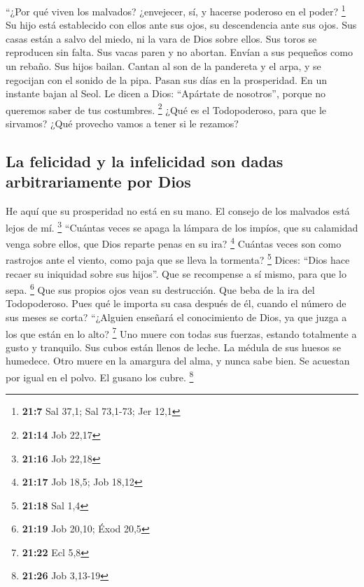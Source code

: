  ``¿Por qué viven los malvados? ¿envejecer, sí, y hacerse
poderoso en el poder? \footnote{\textbf{21:7} Sal 37,1; Sal 73,1-73; Jer
  12,1}  Su hijo está establecido con ellos ante sus ojos,
su descendencia ante sus ojos.  Sus casas están a salvo
del miedo, ni la vara de Dios sobre ellos.  Sus toros se
reproducen sin falta. Sus vacas paren y no abortan. 
Envían a sus pequeños como un rebaño. Sus hijos bailan. 
Cantan al son de la pandereta y el arpa, y se regocijan con el sonido de
la pipa.  Pasan sus días en la prosperidad. En un
instante bajan al Seol.  Le dicen a Dios: ``Apártate de
nosotros'', porque no queremos saber de tus costumbres. \footnote{\textbf{21:14}
  Job 22,17}  ¿Qué es el Todopoderoso, para que le
sirvamos? ¿Qué provecho vamos a tener si le rezamos?

\hypertarget{la-felicidad-y-la-infelicidad-son-dadas-arbitrariamente-por-dios}{%
\subsection{La felicidad y la infelicidad son dadas arbitrariamente por
Dios}\label{la-felicidad-y-la-infelicidad-son-dadas-arbitrariamente-por-dios}}

 He aquí que su prosperidad no está en su mano. El
consejo de los malvados está lejos de mí. \footnote{\textbf{21:16} Job
  22,18}  ``Cuántas veces se apaga la lámpara de los
impíos, que su calamidad venga sobre ellos, que Dios reparte penas en su
ira? \footnote{\textbf{21:17} Job 18,5; Job 18,12} 
Cuántas veces son como rastrojos ante el viento, como paja que se lleva
la tormenta? \footnote{\textbf{21:18} Sal 1,4}  Dices:
``Dios hace recaer su iniquidad sobre sus hijos''. Que se recompense a
sí mismo, para que lo sepa. \footnote{\textbf{21:19} Job 20,10; Éxod
  20,5}  Que sus propios ojos vean su destrucción. Que
beba de la ira del Todopoderoso.  Pues qué le importa su
casa después de él, cuando el número de sus meses se corta?
 ``¿Alguien enseñará el conocimiento de Dios, ya que
juzga a los que están en lo alto? \footnote{\textbf{21:22} Ecl 5,8}
 Uno muere con todas sus fuerzas, estando totalmente a
gusto y tranquilo.  Sus cubos están llenos de leche. La
médula de sus huesos se humedece.  Otro muere en la
amargura del alma, y nunca sabe bien.  Se acuestan por
igual en el polvo. El gusano los cubre. \footnote{\textbf{21:26} Job
  3,13-19}

